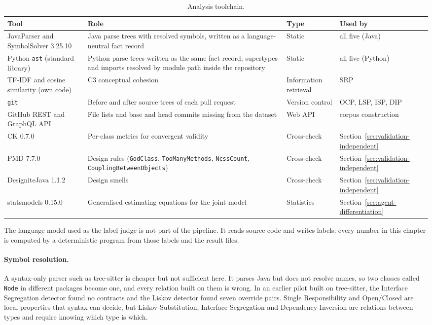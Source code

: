 \begin{table}[p]
\centering
\caption{Analysis toolchain.}
\label{tab:toolchain}
\small
\begin{tabular}{@{}L{2.9cm}L{4.3cm}L{1.7cm}L{2.2cm}@{}}
\toprule
\textbf{Tool} & \textbf{Role} & \textbf{Type} & \textbf{Used by} \\
\midrule
JavaParser and SymbolSolver 3.25.10 & Java parse trees with resolved symbols, written as a
language-neutral fact record & Static & all five (Java) \\
Python \texttt{ast} (standard library) & Python parse trees written as the same fact record;
supertypes and imports resolved by module path inside the repository & Static & all five
(Python) \\
TF-IDF and cosine similarity (own code) & C3 conceptual cohesion & Information retrieval & SRP \\
\texttt{git} & Before and after source trees of each pull request & Version control & OCP, LSP,
ISP, DIP \\
GitHub REST and GraphQL API & File lists and base and head commits missing from the dataset &
Web API & corpus construction \\
CK 0.7.0 & Per-class metrics for convergent validity & Cross-check &
Section~\ref{sec:validation-independent} \\
PMD 7.7.0 & Design rules (\texttt{GodClass}, \texttt{TooManyMethods}, \texttt{NcssCount},
\texttt{Coupling}\allowbreak\texttt{BetweenObjects}) & Cross-check &
Section~\ref{sec:validation-independent} \\
DesigniteJava 1.1.2 & Design smells \citep{suryanarayana2014smells} & Cross-check &
Section~\ref{sec:validation-independent} \\
statsmodels 0.15.0 & Generalised estimating equations for the joint model & Statistics &
Section~\ref{sec:agent-differentiation} \\
\bottomrule
\end{tabular}
\end{table}

The language model used as the label judge \citep{zheng2023llmjudge} is not part of the pipeline. It
reads source code and writes labels; every number in this chapter is computed by a deterministic
program from those labels and the result files.

\paragraph{Symbol resolution.} A syntax-only parser such as tree-sitter is cheaper but not
sufficient here. It parses Java but does not resolve names, so two classes called \texttt{Node} in
different packages become one, and every relation built on them is wrong. In an earlier pilot built
on tree-sitter, the Interface Segregation detector found no contracts and the Liskov detector found
seven override pairs. Single Responsibility and Open/Closed are local properties that syntax can
decide, but Liskov Substitution, Interface Segregation and Dependency Inversion are relations between
types and require knowing which type is which.


